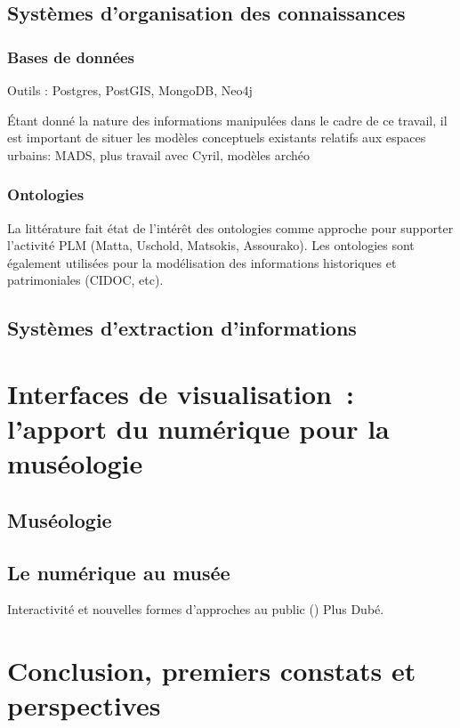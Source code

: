 \documentclass[a4paper,11pt,french]{article}
\begin{document}
\subsection{Systèmes d'organisation des connaissances}

\subsubsection{Bases de données}
Outils : Postgres, PostGIS, MongoDB, Neo4j

Étant donné la nature des informations manipulées dans le cadre de ce travail, il est important de situer les modèles conceptuels existants relatifs aux espaces urbains:
MADS, plus travail avec Cyril, modèles archéo

\subsubsection{Ontologies}
La littérature fait état de l'intérêt des ontologies comme approche pour supporter l'activité PLM (Matta, Uschold, Matsokis, Assourako).
Les ontologies sont également utilisées pour la modélisation des informations historiques et patrimoniales (CIDOC, etc).

\subsection{Systèmes d'extraction d'informations}


\section{Interfaces de visualisation~: l'apport du numérique pour la muséologie}

\subsection{Muséologie}

\subsection{Le numérique au musée}
Interactivité et nouvelles formes d'approches au public ()
\cite{LAROCHE-2010-473007}
Plus Dubé.

\section{Conclusion, premiers constats et perspectives}


\newpage
\singlespacing
\begin{footnotesize}
   
  
  \nocite{*}
\end{footnotesize}
\doublespacing
\end{document}
